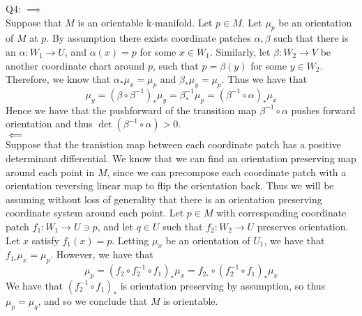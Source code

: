 \documentclass[letterpaper]{article}
\begin{document}
\noindent Q4: $\implies$
\\ \newline Suppose that $M$ is an orientable k-manifold. Let $p\in M$. Let $\mu_p$ be an orientation of $M$ at $p$. By assumption there exists coordinate patches $\alpha,\beta$ such that there is an $\alpha:W_1 \to U$, and $\alpha(x)=p$ for some $x\in W_1$. Similarly, let $\beta: W_2 \to V$ be another coordinate chart around $p$, such that $p=\beta(y)$ for some $y\in W_2$. Therefore, we know that $\alpha_\ast \mu_x=\mu_p$ and $\beta_\ast \mu_y = \mu_p$. Thus we have that $$\mu_y = (\beta\circ \beta^{-1})_\ast \mu_y = \beta_\ast^{-1} \mu_p = (\beta^{-1}\circ \alpha)_{\ast} \mu_x$$ Hence we have that the pushforward of the transition map $\beta^{-1}\circ \alpha$ pushes forward orientation and thus $\det(\beta^{-1}\circ \alpha)>0$. 
\newline \\ $\impliedby$
\\ \newline Suppose that the tranistion map between each coordinate patch has a positive determinant differential. We know that we can find an orientation preserving map around each point in $M$, since we can precompose each coordinate patch with a orientation reversing linear map to flip the orientation back. Thus we will be assuming without loss of generality that there is an orientation preserving coordinate system around each point. Let $p\in M$ with corresponding coordinate patch $f_1:W_1\to U\ni p$, and let $q\in U$ such that $f_2:W_2 \to U$ preserves orientation. Let $x$ satisfy $f_1(x)=p$. Letting $\mu_x$ be an orientation of $U_1$, we have that $f_{1_\ast}\mu_x = \mu_p$. However, we have that $$ \mu_p = (f_2 \circ f_2^{-1}\circ f_1)_{\ast} \mu_x  = f_{2_\ast} \circ (f_2^{-1}\circ f_1)_{\ast}\mu_x$$ 
We have that $(f^{-1}_2 \circ f_1)_{\ast}$ is orientation preserving by assumption, so thus $\mu_p=\mu_q$, and so we conclude that $M$ is orientable. 
\end{document}
